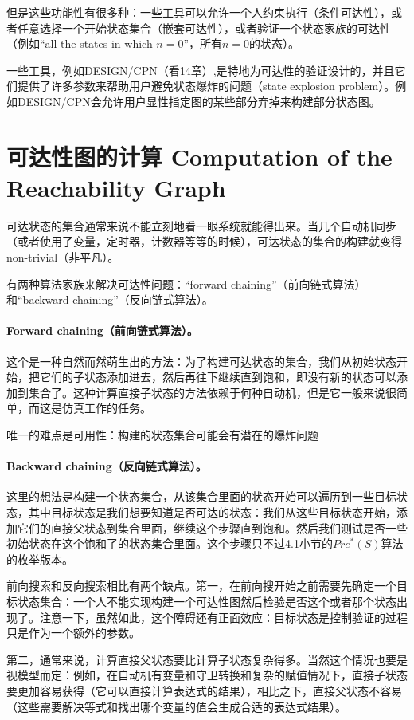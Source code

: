 \documentclass{book}
\begin{document}
    但是这些功能性有很多种：一些工具可以允许一个人约束执行（条件可达性），或者任意选择一个开始状态集合（嵌套可达性），或者验证一个状态家族的可达性（例如“all the states in which $n=0$”，所有$n=0$的状态）。

    一些工具，例如DESIGN/CPN（看14章）,是特地为可达性的验证设计的，并且它们提供了许多参数来帮助用户避免状态爆炸的问题（state explosion problem）。例如DESIGN/CPN会允许用户显性指定图的某些部分弃掉来构建部分状态图。

    \section{可达性图的计算 Computation of the Reachability Graph}
    可达状态的集合通常来说不能立刻地看一眼系统就能得出来。当几个自动机同步（或者使用了变量，定时器，计数器等等的时候），可达状态的集合的构建就变得non-trivial（非平凡）。

    有两种算法家族来解决可达性问题：“forward chaining”（前向链式算法）和“backward chaining”（反向链式算法）。

    \paragraph{Forward chaining（前向链式算法）。} 这个是一种自然而然萌生出的方法：为了构建可达状态的集合，我们从初始状态开始，把它们的子状态添加进去，然后再往下继续直到饱和，即没有新的状态可以添加到集合了。这种计算直接子状态的方法依赖于何种自动机，但是它一般来说很简单，而这是仿真工作的任务。

    唯一的难点是可用性：构建的状态集合可能会有潜在的爆炸问题

    \paragraph{Backward chaining（反向链式算法）。} 这里的想法是构建一个状态集合，从该集合里面的状态开始可以遍历到一些目标状态，其中目标状态是我们想要知道是否可达的状态：我们从这些目标状态开始，添加它们的直接父状态到集合里面，继续这个步骤直到饱和。然后我们测试是否一些初始状态在这个饱和了的状态集合里面。这个步骤只不过4.1小节的$Pre^*(S)$算法的枚举版本。

    前向搜索和反向搜索相比有两个缺点。第一，在前向搜开始之前需要先确定一个目标状态集合：一个人不能实现构建一个可达性图然后检验是否这个或者那个状态出现了。注意一下，虽然如此，这个障碍还有正面效应：目标状态是控制验证的过程只是作为一个额外的参数。

    第二，通常来说，计算直接父状态要比计算子状态复杂得多。当然这个情况也要是视模型而定：例如，在自动机有变量和守卫转换和复杂的赋值情况下，直接子状态要更加容易获得（它可以直接计算表达式的结果），相比之下，直接父状态不容易（这些需要解决等式和找出哪个变量的值会生成合适的表达式结果）。
\end{document}
